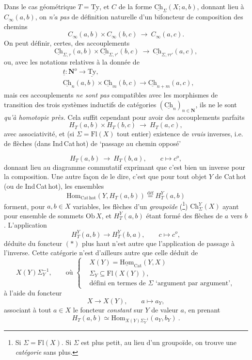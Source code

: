 \documentclass[11pt]{article}
\newcommand{\printedpage}[1]{\marginpar{\footnotesize p.~#1}}
\newcommand{\msp}[1]{\marginpar{\footnotesize [#1]}}
\newcommand{\Ch}{\underline{\mathrm{Ch}}}
\newcommand{\Ty}{\underline{\mathrm{Ty}}}
\begin{document}
\msp{page 115}
Dans le cas géométrique $T = \Ty$, et $C$ de la forme $\Ch_{\Sigma}(X;a,b)$, donnant lieu à $C_{\infty}(a,b)$, on \textit{n'a pas} de définition naturelle d'un bifoncteur de composition des chemins
\[
C_{\infty}(a,b) \times C_{\infty}(b,c) \ \longrightarrow\ C_{\infty}(a,c).
\]
On peut définir, certes, des accouplements
\[
\Ch_{\Sigma,\tau}(a,b) \times \Ch_{\Sigma,\tau'}(b,c) \ \longrightarrow\ \Ch_{\Sigma,\tau\tau'}(a,c),
\]
ou, avec les notations relatives à la donnée de
\[
\begin{aligned}
&\underline{t} : \mathbf{N}^{o} \longrightarrow \Ty,\\
&\Ch_{n}(a,b) \times \Ch_{m}(b,c) \longrightarrow \Ch_{n+m}(a,c),
\end{aligned}
\]
\printedpage{73}
mais ces accouplements \textit{ne sont pas} compatibles avec les morphismes de transition des trois systèmes inductifs de catégories $(\Ch_{n})_{n\in\mathbf{N}}$, ils ne le sont \textit{qu'à homotopie près.} Cela suffit cependant pour avoir des accouplements parfaits
\[
H_{T}(a,b) \times H_{T}(b,c) \ \longrightarrow\ H_{T}(a,c),
\]
avec associativité, et (si $\Sigma = \mathrm{Fl}(X)$ tout entier) existence de \textit{vrais} inverses, i.e. de flèches (dans Ind\,Cat\,hot) de `passage au chemin opposé'

\msp{page 116}
\[
H_{T}(a,b) \ \longrightarrow\ H_{T}(b,a), \qquad c \longmapsto c^{o}, \tag*{$(*)$}
\]
donnant lieu au diagramme commutatif exprimant que c'est bien un inverse pour la composition. Une autre façon de le dire, c'est que pour tout objet $Y$ de Cat\,hot (ou de Ind\,Cat\,hot), les ensembles
\[
\mathrm{Hom}_{\mathrm{Cat\,hot}}(Y, H_{T}(a,b)) \overset{\text{déf}}{=} H_{T}^{Y}(a,b)
\]
forment, pour $a,b \in X$ variables, les flèches d'un \textit{groupoïde} (\footnote[25]{Si $\Sigma = \mathrm{Fl}(X)$. Si $\Sigma$ est plus petit, au lieu d'un groupoïde, on trouve une \textit{catégorie} sans plus.}) $\mathrm{Ch}_{\Sigma}^{Y}(X)$ ayant pour ensemble de sommets $\mathrm{Ob}\,X$, et $H_{T}^{Y}(a,b)$ étant formé des flèches de $a$ vers $b$. L'application
\[
H_{T}^{Y}(a,b) \longrightarrow H_{T}^{Y}(b,a), \qquad c \longmapsto c^{o},
\]
déduite du foncteur $(*)$ plus haut n'est autre que l'application de passage à l'inverse. Cette catégorie n'est d'ailleurs autre que celle déduit de %
\[
X(Y)\Sigma_{Y}^{-1}, \qquad \text{où } \left\{
\begin{aligned}
&X(Y) = \underline{\mathrm{Hom}}_{\mathrm{Cat}}(Y,X)\\
&\Sigma_{Y} \subseteq \mathrm{Fl}(X(Y)),\\
&\text{défini en termes de } \Sigma \text{ `argument par argument'},
\end{aligned}
\right.
\]
à l'aide du foncteur
\[
X \longrightarrow X(Y), \qquad a \longmapsto a_{Y},
\]
\msp{page 117}
associant à tout $a \in X$ le foncteur \textit{constant} sur $Y$ de valeur $a$, en prenant
\[
H_{T}(a,b) \simeq \mathrm{Hom}_{X(Y)\Sigma_{Y}^{-1}}(a_{Y}, b_{Y}) \ .
\]
\end{document}
